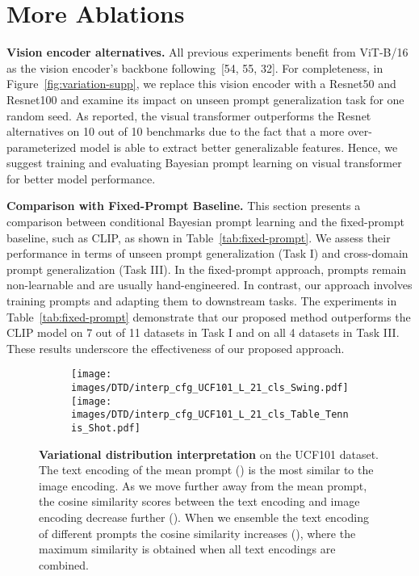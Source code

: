 \documentclass[10pt,twocolumn,letterpaper]{article}
\begin{document}
\section{More Ablations}
\label{more_ablation}
\textbf{Vision encoder alternatives.}
All previous experiments benefit from ViT-B/16 as the vision encoder's backbone following~[\textcolor{refcolor}{54}, \textcolor{refcolor}{55}, \textcolor{refcolor}{32}]. For completeness, in Figure~\ref{fig:variation-supp}, we replace this vision encoder with a Resnet50 and Resnet100 and examine its impact on unseen prompt generalization task for one random seed. As reported, the visual transformer outperforms the Resnet alternatives on 10 out of 10 benchmarks due to the fact that a more over-parameterized model is able to extract better generalizable features.
Hence, we suggest training and evaluating Bayesian prompt learning on visual transformer for better model performance.

\textbf{Comparison with Fixed-Prompt Baseline.} This section presents a comparison between conditional Bayesian prompt learning and the fixed-prompt baseline, such as CLIP, as shown in Table~\ref{tab:fixed-prompt}. We assess their performance in terms of unseen prompt generalization (Task I) and cross-domain prompt generalization (Task III). In the fixed-prompt approach, prompts remain non-learnable and are usually hand-engineered. In contrast, our approach involves training prompts and adapting them to downstream tasks. The experiments in Table~\ref{tab:fixed-prompt} demonstrate that our proposed method outperforms the CLIP model on 7 out of 11 datasets in Task I and on all 4 datasets in Task III. These results underscore the effectiveness of our proposed approach. 

\begin{figure*}[t!]
\centering
\begin{subfigure}{0.96\linewidth}
  \centering
  \texttt{[image: images/DTD/interp\_cfg\_UCF101\_L\_21\_cls\_Swing.pdf]}
  \texttt{[image: images/DTD/interp\_cfg\_UCF101\_L\_21\_cls\_Table\_Tennis\_Shot.pdf]}
\end{subfigure}\vspace{-2mm}
\caption{\textbf{Variational distribution interpretation} on the UCF101 dataset. The text encoding of the mean prompt  () is the most similar to the image encoding. As we move further away from the mean prompt, the cosine similarity scores between the text encoding and image encoding decrease further ().
When we ensemble the text encoding of different prompts the cosine similarity increases (), where the maximum similarity is obtained when all text encodings are combined. 
}
\vspace{-2mm}
\label{fig:interpretation-2}
\end{figure*}
\end{document}
